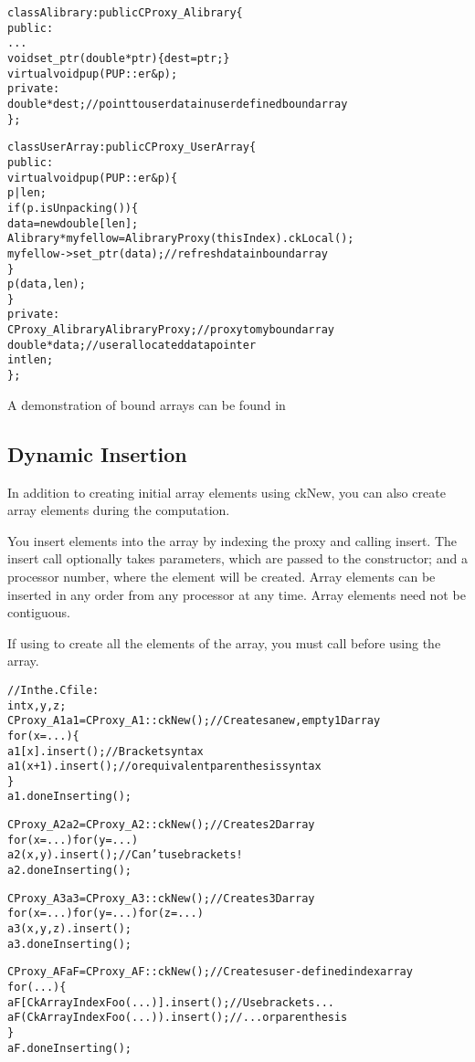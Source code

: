 \begin{alltt}
class Alibrary: public CProxy_Alibrary \{
public:
  ...
  void set_ptr(double *ptr) \{ dest = ptr; \}
  virtual void pup(PUP::er &p);
private:
  double *dest;           // point to user data in user defined bound array
\};

class UserArray: public CProxy_UserArray \{
public:
  virtual void pup(PUP::er &p) \{
                p|len;
                if(p.isUnpacking()) \{ 
                  data = new double[len];
                  Alibrary *myfellow = AlibraryProxy(thisIndex).ckLocal();
                  myfellow->set_ptr(data);    // refresh data in bound array
                \}
                p(data, len);
  \}
private:
  CProxy_Alibrary  AlibraryProxy;   // proxy to my bound array
  double *data;          // user allocated data pointer
  int len;
\};
\end{alltt}

A demonstration of bound arrays can be found in


\subsection{Dynamic Insertion}
\label{dynamic_insertion}

In addition to creating initial array elements using ckNew,
you can also
create array elements during the computation.

You insert elements into the array by indexing the proxy
and calling insert.  The insert call optionally takes 
parameters, which are passed to the constructor; and a
processor number, where the element will be created.
Array elements can be inserted in any order from 
any processor at any time.  Array elements need not 
be contiguous.

If using  to create all the elements of the array,
you must call  before using
the array.

\begin{alltt}
//In the .C file:
int x,y,z;
CProxy_A1 a1=CProxy_A1::ckNew();  //Creates a new, empty 1D array
for (x=...) \{
   a1[x  ].insert();  //Bracket syntax
   a1(x+1).insert();  // or equivalent parenthesis syntax
\}
a1.doneInserting();

CProxy_A2 a2=CProxy_A2::ckNew();   //Creates 2D array
for (x=...) for (y=...)
   a2(x,y).insert();  //Can't use brackets!
a2.doneInserting();

CProxy_A3 a3=CProxy_A3::ckNew();   //Creates 3D array
for (x=...) for (y=...) for (z=...)
   a3(x,y,z).insert();
a3.doneInserting();

CProxy_AF aF=CProxy_AF::ckNew();   //Creates user-defined index array
for (...) \{
   aF[CkArrayIndexFoo(...)].insert(); //Use brackets...
   aF(CkArrayIndexFoo(...)).insert(); //  ...or parenthesis
\}
aF.doneInserting();

\end{alltt}

